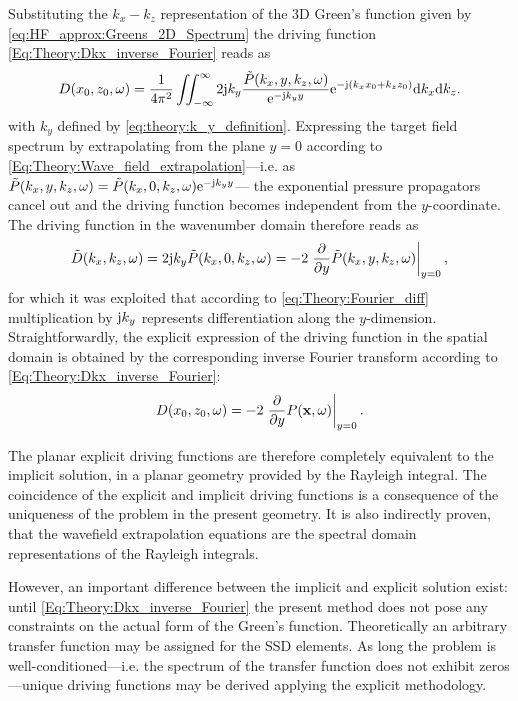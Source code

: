 Substituting the $k_x-k_z$ representation of the 3D Green's function given by \eqref{eq:HF_approx:Greens_2D_Spectrum} the driving function \eqref{Eq:Theory:Dkx_inverse_Fourier} reads as
\begin{equation}
D(x_0,z_0,\omega) = \frac{1}{4\pi^2} \iint_{-\infty}^{\infty} 2\mathrm{j} k_y \frac{\tilde{P}(k_x,y,k_z, \omega)}{ \mathrm{e}^{ -\mathrm{j} k_y  y  } } \mathrm{e}^{-\mathrm{j} (k_x x_0 + k_z z_0)} \mathrm{d} k_x \mathrm{d} k_z.
\end{equation}
with $k_y$ defined by \eqref{eq:theory:k_y_definition}.	
Expressing the target field spectrum by extrapolating from the plane $y = 0$ according to \eqref{Eq:Theory:Wave_field_extrapolation}---i.e. as 
$
\tilde{P}(k_x,y,k_z, \omega) = \tilde{P}(k_x,0,k_z, \omega)  \mathrm{e}^{ -\mathrm{j} k_y  y }
$---
the exponential pressure propagators cancel out and the driving function becomes independent from the $y$-coordinate. 
The driving function in the wavenumber domain therefore reads as
\begin{equation}
\tilde{D}(k_x,k_z,\omega) = 2\mathrm{j} k_y \tilde{P}(k_x,0,k_z,\omega) = -2 \left. \frac{\partial}{\partial y} \tilde{P}(k_x,y,k_z,\omega) \right|_{y = 0},
\label{Eq:Theory:Planar_explicit_driv_fun}
\end{equation}
for which it was exploited that according to \eqref{eq:Theory:Fourier_diff} multiplication by $\mathrm{j} k_y$ represents differentiation along the $y$-dimension.
Straightforwardly, the explicit expression of the driving function in the spatial domain is obtained by the corresponding inverse Fourier transform according to \eqref{Eq:Theory:Dkx_inverse_Fourier}:
\begin{equation}
D(x_0,z_0,\omega) = -2 \left. \frac{\partial}{\partial y} P(\mathbf{x},\omega) \right|_{y = 0}.
\label{Eq:Theory:Planar_explicit_driv_fun_spatial}
\end{equation}

The planar explicit driving functions are therefore completely equivalent to the implicit solution, in a planar geometry provided by the Rayleigh integral.
The coincidence of the explicit and implicit driving functions is a consequence of the uniqueness of the problem in the present geometry.
It is also indirectly proven, that the wavefield extrapolation equations are the spectral domain representations of the Rayleigh integrals.

However, an important difference between the implicit and explicit solution exist: until \eqref{Eq:Theory:Dkx_inverse_Fourier} the present method does not pose any constraints on the actual form of the Green's function. 
Theoretically an arbitrary transfer function may be assigned for the SSD elements. 
As long the problem is well-conditioned---i.e. the spectrum of the transfer function does not exhibit zeros---unique driving functions may be derived applying the explicit methodology.

